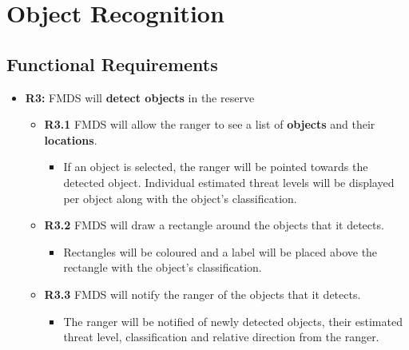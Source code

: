 \section{ Object Recognition }
\subsection{Functional Requirements}
	\begin{flushleft}
		\begin{itemize}
			\item{\textbf{R3:}} FMDS will \textbf{detect objects} in the reserve
				\begin{itemize}
					\item{\textbf{R3.1}} FMDS will allow the ranger to see a list of \textbf{objects} and their \textbf{locations}.
						\begin{itemize}
							\item If an object is selected, the ranger will be pointed towards the detected object. Individual estimated threat levels will be displayed per object along with the object's classification.
						\end{itemize} 
					\item{\textbf{R3.2}} FMDS will draw a rectangle around the objects that it detects.
						\begin{itemize}
							\item Rectangles will be coloured and a label will be placed above the rectangle with the object's classification.
						\end{itemize} 
					\item{\textbf{R3.3}} FMDS will notify the ranger of the objects that it detects.
						\begin{itemize}
							\item The ranger will be notified of newly detected objects, their estimated threat level, classification and relative direction from the ranger.
						\end{itemize} 
				\end{itemize}
		\end{itemize}
	\end{flushleft}

